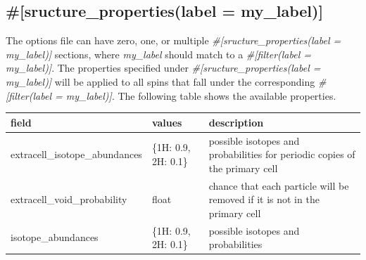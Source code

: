 \documentclass{book}
\begin{document}
\subsection{\#[sructure\_properties(label = my\_label)]}
The options file can have zero, one, or multiple 
\textit{\#[sructure\_properties(label = my\_label)]} sections,
where \textit{my\_label} should match to a 
\textit{\#[filter(label = my\_label)]}.
The properties specified under  
\textit{\#[sructure\_properties(label = my\_label)]} will be applied
to all spins that fall under the corresponding
\textit{\#[filter(label = my\_label)]}.
The following table shows the available properties.
\begin{center}
\begin{tabular}{| m{20em} | m{1.5cm}| m{7cm} |}
 \hline 
 \textbf{field} & \textbf{values} & \textbf{description} \\ 
 \hline 
 extracell\_isotope\_abundances & \{1H: 0.9, 2H: 0.1\} & 
 possible isotopes and probabilities for periodic copies of the primary cell\\
 \hline 
 extracell\_void\_probability & float & chance that each particle will be removed
 if it is not in the primary cell\\
 \hline 
 isotope\_abundances & \{1H: 0.9, 2H: 0.1\} & possible isotopes and
 probabilities\\
 \hline 
\end{tabular}
\end{center} 

\end{document}
